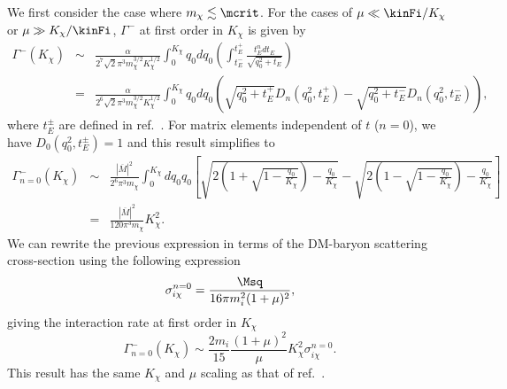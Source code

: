 We first consider the case where $m_\chi \lesssim \mcrit$. 
For the cases of $\mu \ll \kinFi/K_\chi$ or $\mu \gg K_\chi/\kinFi$, 
$\Gamma^{-}$ at first order in $K_\chi$ is given by
\begin{eqnarray}
\Gamma^{-}(K_\chi) &\sim& \frac{\alpha}{2^7\sqrt{2}\pi^3m_\chi^{3/2}K_\chi^{1/2}}\int_0^{K_\chi}q_0 dq_0 \left(\int_{t_{E}^{-}}^{t_{E}^{+}} \frac{t_E^n dt_E }{\sqrt{q_0^2+t_E}} \right)\\
&=& \frac{\alpha}{2^6\sqrt{2}\pi^3m_\chi^{3/2}K_\chi^{1/2}}\int_0^{K_\chi}q_0 dq_0 \left(\sqrt{q_0^2+t_E^{+}}D_n(q_0^2,t_E^{+})-\sqrt{q_0^2+t_E^{-}}D_n(q_0^2,t_E^{-})\right), \label{eq:intratelowe}
\end{eqnarray}
where $t_E^\pm$ are defined in ref.~\cite{Bell:2020jou}. 
For matrix elements independent of $t$ ($n=0$), we have $D_0(q_0^2,t_E^{\pm})=1$  and this result simplifies to
\begin{eqnarray}
\Gamma_{n=0}^{-}(K_\chi) 
&\sim&  \frac{|\overline{M}|^2}{2^6\pi^3m_\chi}\int_{0}^{K_\chi} dq_0 q_0 \left[\sqrt{2\left(1+\sqrt{1-\frac{q_0}{K_\chi}}\right)-\frac{q_0}{K_\chi}}-\sqrt{2\left(1-\sqrt{1-\frac{q_0}{K_\chi}}\right)-\frac{q_0}{K_\chi}}\right] \nonumber \\
&=& \frac{|\overline{M}|^2}{120\pi^3m_\chi}K_\chi^2.
\end{eqnarray}
We can rewrite the previous expression in terms of the DM-baryon scattering cross-section using the following expression
\begin{equation}
\sigma_{i\chi}^{n=0} = \frac{\Msq}{16\pi m_i^2 (1+\mu)^2}, 
\label{eq:intraten0}
\end{equation}
giving the interaction rate at first order in $K_\chi$
\begin{equation}
\Gamma_{n=0}^{-}(K_\chi)  \sim \frac{2 m_i}{15}\frac{(1+\mu)^2}{\mu}K_\chi^2 \sigma_{i\chi}^{n=0}.
\end{equation}
This result has the same $K_\chi$ and $\mu$ scaling as that of ref.~\cite{Bertoni:2013bsa}.



